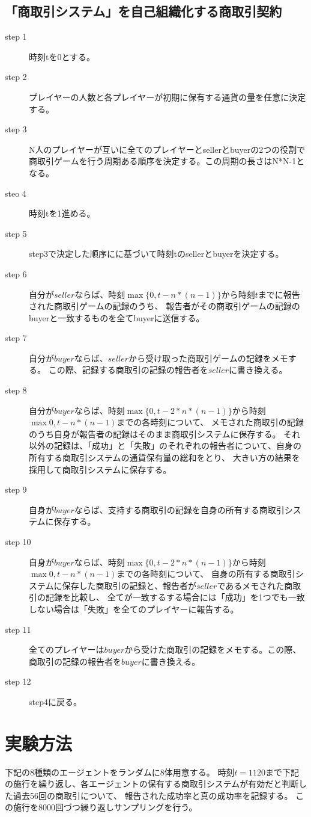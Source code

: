 \subsection{「商取引システム」を自己組織化する商取引契約}
\begin{description}
  \item[step 1] 時刻tを0とする。
  \item[step 2] プレイヤーの人数と各プレイヤーが初期に保有する通貨の量を任意に決定する。
  \item[step 3] N人のプレイヤーが互いに全てのプレイヤーとsellerとbuyerの2つの役割で商取引ゲームを行う周期ある順序を決定する。この周期の長さはN*N-1となる。
  \item[steo 4] 時刻tを1進める。
  \item[step 5] step3で決定した順序にに基づいて時刻tのsellerとbuyerを決定する。
  \item[step 6] 自分が$seller$ならば、時刻$\max\{0, t-n*(n-1)\}$から時刻$t$までに報告された商取引ゲームの記録のうち、
    報告者がその商取引ゲームの記録のbuyerと一致するものを全てbuyerに送信する。
  \item[step 7] 自分が$buyer$ならば、$seller$から受け取った商取引ゲームの記録をメモする。
    この際、記録する商取引の記録の報告者を$seller$に書き換える。
  \item[step 8] 自分が$buyer$ならば、時刻$\max\{0, t-2*n*(n-1)\}$から時刻$\max{0, t-n*(n-1)}$までの各時刻について、
    メモされた商取引の記録のうち自身が報告者の記録はそのまま商取引システムに保存する。
    それ以外の記録は、「成功」と「失敗」のそれぞれの報告者について、自身の所有する商取引システムの通貨保有量の総和をとり、
    大きい方の結果を採用して商取引システムに保存する。
  \item[step 9] 自身が$buyer$ならば、支持する商取引の記録を自身の所有する商取引システムに保存する。
  \item[step 10] 自身が$buyer$ならば、時刻$\max\{0, t-2*n*(n-1)\}$から時刻$\max{0, t-n*(n-1)}$までの各時刻について、
    自身の所有する商取引システムに保存した商取引の記録と、報告者が$seller$であるメモされた商取引の記録を比較し、
    全てが一致するする場合には「成功」を1つでも一致しない場合は「失敗」を全てのプレイヤーに報告する。
  \item[step 11] 全てのプレイヤーは$buyer$から受けた商取引の記録をメモする。この際、商取引の記録の報告者を$buyer$に書き換える。
  \item[step 12] step4に戻る。
\end{description}

\section{実験方法}
下記の8種類のエージェントをランダムに8体用意する。
時刻$t=1120$まで下記の施行を繰り返し、各エージェントの保有する商取引システムが有効だと判断した過去56回の商取引について、
報告された成功率と真の成功率を記録する。
この施行を8000回づつ繰り返しサンプリングを行う。

